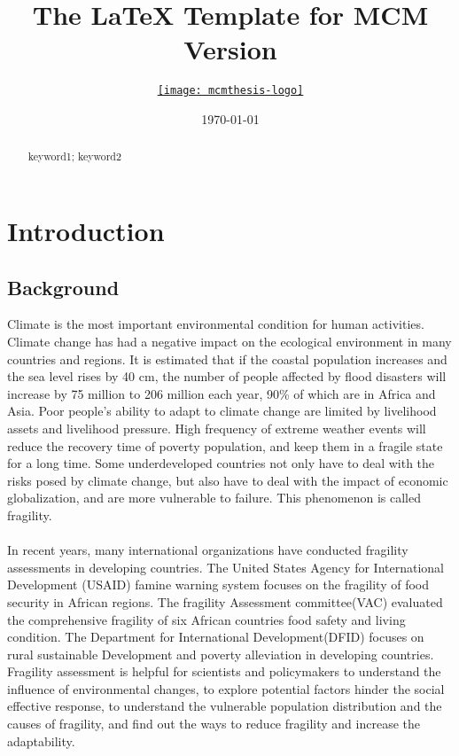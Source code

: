 \documentclass{mcmthesis}
\title{The \LaTeX{} Template for MCM Version \MCMversion}
\author{\small \href{http://www.latexstudio.net/}
  {\texttt{[image: mcmthesis-logo]}}}
\date{\today}
\begin{document}
\begin{abstract}
\lipsum[1]
\begin{keywords}
keyword1; keyword2
\end{keywords}
\end{abstract}
\maketitle
\tableofcontents

\newpage
\section{Introduction}
\subsection{Background}
Climate is the most important environmental condition for human activities.
Climate change has had a negative impact on the ecological environment in 
many countries and regions. It is estimated that if the coastal population 
increases and the sea level rises by 40 cm, the number of people affected by 
flood disasters will increase by 75 million to 206 million each year, 90\% of
which are in Africa and Asia. Poor people's ability to adapt to climate change 
are limited by livelihood assets and livelihood pressure. High frequency of
extreme weather events will reduce the recovery time of poverty population, 
and keep them in a fragile state for a long time. Some underdeveloped 
countries not only have to deal with the risks posed by climate change, 
but also have to deal with the impact of economic globalization, 
and are more vulnerable to failure. This phenomenon is called fragility.\\\\
In recent years, many international organizations have conducted fragility 
assessments in developing countries. The United States Agency for International
Development (USAID) famine warning system focuses on the fragility of 
food security in African regions. The fragility Assessment committee(VAC) 
evaluated the comprehensive fragility of six African countries food safety 
and living condition. The Department for International Development(DFID)
focuses on rural sustainable Development and poverty alleviation in developing
countries. Fragility assessment is helpful for scientists and 
policymakers to understand the influence of environmental changes, 
to explore potential factors hinder the social effective response, 
to understand the vulnerable population distribution and the causes 
of fragility, and find out the ways to reduce fragility and 
increase the adaptability.
\end{document}
